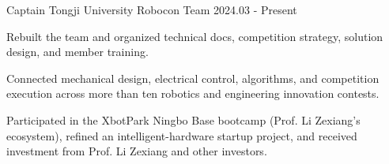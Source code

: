 
\begin{cventries}

  \cventry
    {Captain}
    {Tongji University Robocon Team}
    {}
    {2024.03 - Present}
    {
      \begin{cvitems}
        \item {Rebuilt the team and organized technical docs, competition strategy, solution design, and member training.}
        \item {Connected mechanical design, electrical control, algorithms, and competition execution across more than ten robotics and engineering innovation contests.}
      \end{cvitems}
    }

  \vspace{-1.8mm}
  \begin{cvparagraph}
  \bodyfontlight Participated in the XbotPark Ningbo Base bootcamp (Prof. Li Zexiang's ecosystem), refined an intelligent-hardware startup project, and received investment from Prof. Li Zexiang and other investors.
  \end{cvparagraph}

\end{cventries}
